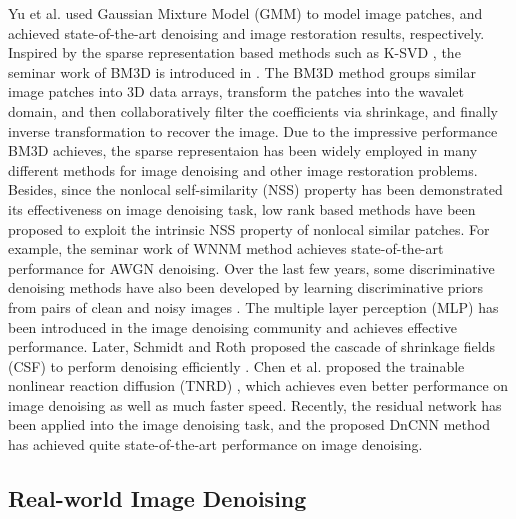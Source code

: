 Yu et al.  \cite{ple} used Gaussian Mixture Model (GMM) to model image patches, and achieved state-of-the-art denoising and image restoration results, respectively. Inspired by the sparse representation based methods such as K-SVD \cite{ksvd}, the seminar work of BM3D is introduced in \cite{bm3d}. The BM3D method groups similar image patches into 3D data arrays, transform the  patches into the wavalet domain, and then collaboratively filter the coefficients via shrinkage, and finally inverse transformation to recover the image. Due to the impressive performance BM3D achieves, the sparse representaion has been widely employed in many different methods \cite{lssc,ncsr} for image denoising and other image restoration problems. Besides, since the nonlocal self-similarity (NSS) property has been demonstrated its effectiveness on image denoising task, low rank based methods \cite{nnm,wnnm} have been proposed to exploit the intrinsic NSS property of nonlocal similar patches. For example, the seminar work of WNNM \cite{wnnm} method achieves state-of-the-art performance for AWGN denoising. Over the last few years, some discriminative denoising methods have also been developed by learning discriminative priors from pairs of clean and noisy images \cite{mlp,csf,tnrd, dncnn}. The multiple layer perception (MLP) \cite{mlp} has been introduced in the image denoising community and achieves effective performance. Later, Schmidt and Roth proposed the cascade of shrinkage fields (CSF) to perform denoising efficiently \cite{csf}. Chen et al. proposed the trainable nonlinear reaction diffusion (TNRD) \cite{tnrd}, which achieves even better performance on image denoising as well as much faster speed. Recently, the residual network \cite{residualnetwork} has been applied into the image denoising task, and the proposed DnCNN method \cite{dncnn} has achieved quite state-of-the-art performance on image denoising.


\subsection{Real-world Image Denoising}
\label{sec:review:feature}

